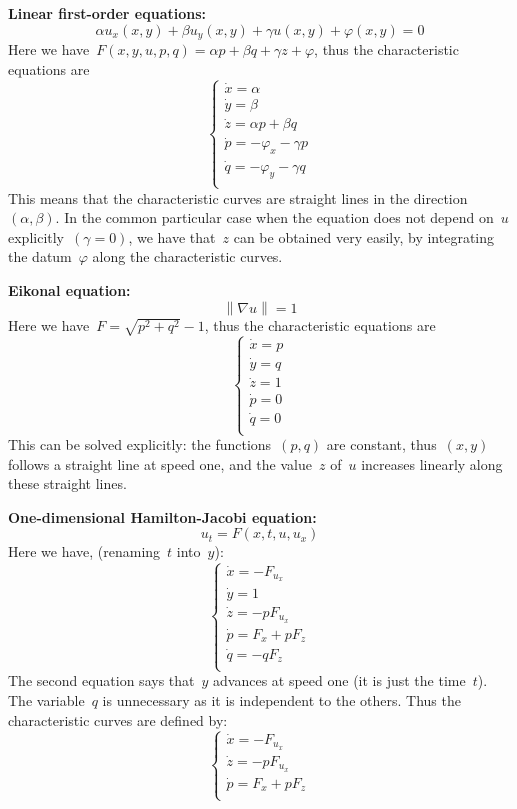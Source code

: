 {\bf Linear first-order equations:}
\[
	\alpha u_x(x,y)+\beta u_y(x,y)+\gamma u(x,y)+\varphi(x,y)=0
\]
Here we have~$F(x,y,u,p,q)=\alpha p+\beta q+\gamma z+ \varphi$, thus the
characteristic equations are
\[
	\begin{cases}
		\dot x = \alpha \\
		\dot y = \beta \\
		\dot z = \alpha p + \beta q \\
		\dot p = -\varphi_x - \gamma p \\
		\dot q = -\varphi_y - \gamma q \\
	\end{cases}
\]
This means that the characteristic curves are straight lines in the
direction~$(\alpha,\beta)$.  In the common particular case when the equation
does not depend on~$u$ explicitly~$(\gamma=0)$, we have that~$z$ can be
obtained very easily, by integrating the datum~$\varphi$ along the
characteristic curves.

{\bf Eikonal equation:}
\[
	\left\|\nabla u\right\|=1
\]
Here we have~$F=\sqrt{p^2+q^2}-1$, thus the characteristic equations are
\[
	\begin{cases}
		\dot x = p\\ %
		\dot y = q\\ %
		\dot z = 1\\ %
		\dot p = 0 \\
		\dot q = 0 \\
	\end{cases}
\]
This can be solved explicitly: the functions~$(p,q)$ are constant,
thus~$(x,y)$ follows a straight line at speed one, and the value~$z$ of~$u$
increases linearly along these straight lines.

{\bf One-dimensional Hamilton-Jacobi equation:}
\[
	u_t=F(x,t,u,u_x)
\]
Here we have, (renaming~$t$ into~$y$):
\[
	\begin{cases}
		\dot x = -F_{u_x} \\
		\dot y = 1 \\
		\dot z = -pF_{u_x} \\
		\dot p = F_x+pF_z \\
		\dot q = -qF_z \\
	\end{cases}
\]
The second equation says that~$y$ advances at speed one (it is just the
time~$t$).  The variable~$q$ is unnecessary as it is independent to the
others.  Thus the characteristic curves are defined by:
\[
	\begin{cases}
		\dot x = -F_{u_x} \\
		\dot z = -pF_{u_x} \\
		\dot p = F_x+pF_z \\
	\end{cases}
\]

